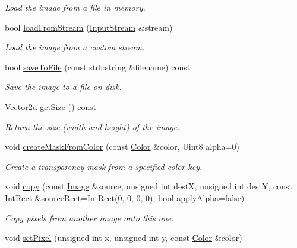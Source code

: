 \begin{DoxyCompactItemize}
\begin{DoxyCompactList}\small\item\em Load the image from a file in memory. \end{DoxyCompactList}\item 
bool \hyperlink{classsf_1_1Image_a21122ded0e8368bb06ed3b9acfbfb501}{load\-From\-Stream} (\hyperlink{classsf_1_1InputStream}{Input\-Stream} \&stream)
\begin{DoxyCompactList}\small\item\em Load the image from a custom stream. \end{DoxyCompactList}\item 
bool \hyperlink{classsf_1_1Image_aec0ed16b67df7b512aaa5c53388ba14e}{save\-To\-File} (const std\-::string \&filename) const 
\begin{DoxyCompactList}\small\item\em Save the image to a file on disk. \end{DoxyCompactList}\item 
\hyperlink{classsf_1_1Vector2}{Vector2u} \hyperlink{classsf_1_1Image_a5c3e9bebdc001c3ebf85ca97039fc86b}{get\-Size} () const 
\begin{DoxyCompactList}\small\item\em Return the size (width and height) of the image. \end{DoxyCompactList}\item 
void \hyperlink{classsf_1_1Image_a22f13f8c242a6b38eb73cc176b37ae34}{create\-Mask\-From\-Color} (const \hyperlink{classsf_1_1Color}{Color} \&color, Uint8 alpha=0)
\begin{DoxyCompactList}\small\item\em Create a transparency mask from a specified color-\/key. \end{DoxyCompactList}\item 
void \hyperlink{classsf_1_1Image_ab2fa337c956f85f93377dcb52153a45a}{copy} (const \hyperlink{classsf_1_1Image}{Image} \&source, unsigned int dest\-X, unsigned int dest\-Y, const \hyperlink{classsf_1_1Rect}{Int\-Rect} \&source\-Rect=\hyperlink{classsf_1_1Rect}{Int\-Rect}(0, 0, 0, 0), bool apply\-Alpha=false)
\begin{DoxyCompactList}\small\item\em Copy pixels from another image onto this one. \end{DoxyCompactList}\item 
void \hyperlink{classsf_1_1Image_a9fd329b8cd7d4439e07fb5d3bb2d9744}{set\-Pixel} (unsigned int x, unsigned int y, const \hyperlink{classsf_1_1Color}{Color} \&color)

\end{DoxyCompactItemize}
